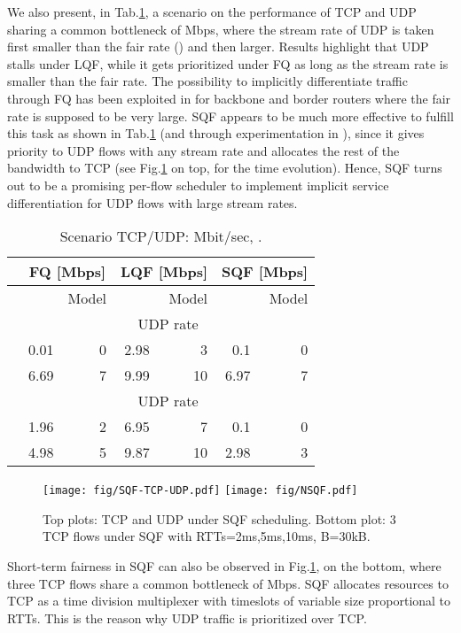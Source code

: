 \documentclass[a4paper,oneside, 11pt]{article}
\begin{document}
We also present, in Tab.\ref{tab:numerics2}, a scenario on the performance of TCP and UDP  sharing a common bottleneck
of Mbps, where the stream rate of UDP  is taken first smaller than the fair rate () and then
larger. Results highlight that UDP stalls under LQF, while
it gets prioritized under FQ as long as the stream rate is smaller than
the fair rate.
The possibility to implicitly differentiate traffic through FQ has been exploited in \cite{hpsr,ancs05} for backbone
and border routers where the fair rate is supposed to be very large. SQF appears to be much more effective
to fulfill this task as shown in Tab.\ref{tab:numerics2} (and through experimentation in \cite{ostallo}),
since it gives priority to UDP flows with any stream rate and allocates the rest of the bandwidth to TCP
(see Fig.\ref{fig:sqf-tcp-dup} on top, for the time evolution).
Hence, SQF turns out to be a promising per-flow scheduler to implement implicit service differentiation for UDP flows
with large stream rates.
\begin{table}
\centering
\begin{tabular}{|l|rr|rr|rr|}
\hline
& \multicolumn{2}{|c}{{FQ [Mbps]}} & \multicolumn{2}{|c}{{LQF [Mbps]}} &\multicolumn{2}{|c|}{{SQF [Mbps]}} \\
\hline
\hline
&  & Model&  & Model&  & Model\\
& \multicolumn{6}{c|}{{UDP rate  }}  \\
  & 0.01 & 0 &2.98  & 3 & 0.1 & 0 \\
  & 6.69 & 7 & 9.99& 10 & 6.97 & 7 \\
\hline
& \multicolumn{6}{c|}{{UDP rate  }}  \\
  & 1.96 & 2 & 6.95 & 7 & 0.1 & 0 \\
  & 4.98 & 5 & 9.87 & 10 & 2.98 & 3 \\
\hline
\end{tabular}
\caption{Scenario TCP/UDP: Mbit/sec, .}
\label{tab:numerics2}
\end{table}

\begin{figure}[htbp]
\centering
\texttt{[image: fig/SQF-TCP-UDP.pdf]}
\texttt{[image: fig/NSQF.pdf]}
\caption{Top plots: TCP and UDP under SQF scheduling. Bottom plot: 3 TCP flows under SQF with RTTs=2ms,5ms,10ms, B=30kB.}
\label{fig:sqf-tcp-dup}
\end{figure}
Short-term fairness in SQF can also be observed in Fig.\ref{fig:sqf-tcp-dup}, on the bottom,
where three TCP flows share a common bottleneck of Mbps.
SQF allocates resources to TCP as a time division multiplexer with timeslots of variable size
proportional to RTTs. This is the reason why UDP traffic is prioritized
over TCP.
\end{document}
